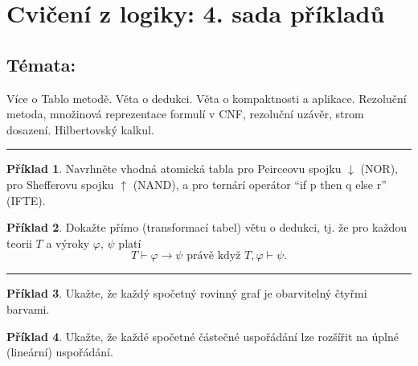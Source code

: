 \documentclass{amsart}
\theoremstyle{definition}
\newtheorem{problem}{Příklad}
\begin{document}
\section*{Cvičení z logiky: 4. sada příkladů}

\bigskip\bigskip\bigskip

\subsection*{Témata:} Více o Tablo metodě. Věta o dedukci. Věta o kompaktnosti a aplikace. Rezoluční metoda, množinová reprezentace formulí v CNF, rezoluční uzávěr, strom dosazení. Hilbertovský kalkul.

\medskip\hrule

\begin{problem} Navrhněte vhodná atomická tabla pro Peirceovu spojku $\downarrow$ (NOR), pro Shefferovu spojku $\uparrow$ (NAND), a pro ternárí operátor ``if p then q else r'' (IFTE).
\end{problem}\medskip

\begin{problem}
Dokažte přímo (transformací tabel) větu o dedukci, tj. že pro každou teorii $T$ a výroky $\varphi$, $\psi$ platí
$$T \vdash \varphi\to \psi\text{\ \ právě když\ \ }T,\varphi \vdash \psi.$$
\end{problem}\medskip


\hrule

\begin{problem}
Ukažte, že každý spočetný rovinný graf je obarvitelný čtyřmi barvami.
\end{problem}\medskip

\begin{problem}
Ukažte, že každé spočetné částečné uspořádání lze rozšířit na úplné (lineární) uspořádání.
\end{problem}\medskip

\end{document}
